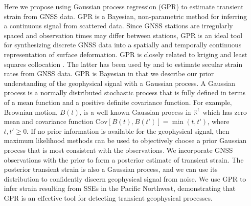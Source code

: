 \documentclass[extra,mreferee]{gji}
\begin{document}
Here we propose using Gaussian process regression (GPR) \citep{Rasmussen2006} to estimate transient strain from GNSS data. GPR is a Bayesian, non-parametric method for inferring a continuous signal from scattered data. Since GNSS stations are irregularly spaced and observation times may differ between stations, GPR is an ideal tool for synthesizing discrete GNSS data into a spatially and temporally continuous representation of surface deformation. GPR is closely related to kriging \citep{Cressie1992} and least squares collocation \citep{Moritz1978}. The latter has been used by \citet{Kato1998} and \citet{El-Fiky1999} to estimate secular strain rates from GNSS data. GPR is Bayesian in that we describe our prior understanding of the geophysical signal with a Gaussian process. A Gaussian process is a normally distributed stochastic process that is fully defined in terms of a mean function and a positive definite covariance function. For example, Brownian motion, $B(t)$, is a well known Gaussian process in $\mathbb{R}^1$ which has zero mean and covariance function $\mathrm{Cov}\left[B(t),B(t')\right] = \min(t,t')$, where $t,t' \ge 0$. If no prior information is available for the geophysical signal, then maximum likelihood methods can be used to objectively choose a prior Gaussian process that is most consistent with the observations.  We incorporate GNSS observations with the prior to form a posterior estimate of transient strain.  The posterior transient strain is also a Gaussian process, and we can use its distribution to confidently discern geophysical signal from noise. We use GPR to infer strain resulting from SSEs in the Pacific Northwest, demonstrating that GPR is an effective tool for detecting transient geophysical processes. 
\end{document}
